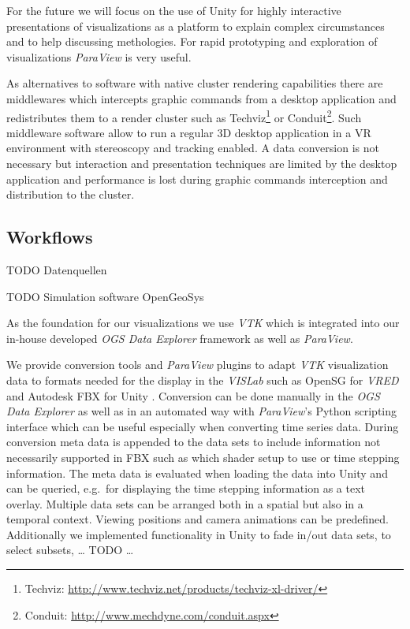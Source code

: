 For the future we will focus on the use of Unity for highly interactive
presentations of visualizations as a platform to explain complex circumstances
and to help discussing methologies. For rapid prototyping and exploration of
visualizations \emph{ParaView} is very useful.

As alternatives to software with native cluster rendering capabilities there are
middlewares which intercepts graphic commands from a desktop application and
redistributes them to a render cluster such as
Techviz\footnote{Techviz: \url{http://www.techviz.net/products/techviz-xl-driver/}} or
Conduit\footnote{Conduit: \url{http://www.mechdyne.com/conduit.aspx}}. Such
middleware software allow to run a regular 3D desktop application in a VR
environment with stereoscopy and tracking enabled. A data conversion is not
necessary but interaction and presentation techniques are limited by the desktop
application and performance is lost during graphic commands interception and
distribution to the cluster.

\subsection{Workflows}
\label{workflows}

TODO Datenquellen

TODO Simulation software OpenGeoSys \cite{kolditz:ogs}

As the foundation for our visualizations we use \emph{VTK} which is
integrated into our in-house developed \emph{OGS Data Explorer} framework
\cite{rink:eesenvirvis} as well as \emph{ParaView}.

We provide conversion tools and \emph{ParaView} plugins to adapt \emph{VTK}
visualization data to formats needed for the display in the \emph{VISLab} such
as OpenSG for \emph{VRED} \cite{bilke:vtkosgconverter} and Autodesk FBX for
Unity \cite{bilke:vtkfbxconverter}. Conversion can be done manually in the
\emph{OGS Data Explorer} as well as in an automated way with \emph{ParaView}'s Python
scripting interface which can be useful especially when converting time
series data. During conversion meta data is appended to the data sets to
include information not necessarily supported in FBX such as which
shader setup to use or time stepping information. The meta data is
evaluated when loading the data into Unity and can be queried, e.g.~for
displaying the time stepping information as a text overlay. Multiple
data sets can be arranged both in a spatial but also in a temporal
context. Viewing positions and camera animations can be predefined.
Additionally we implemented functionality in Unity to fade in/out data
sets, to select subsets, \ldots{} TODO \ldots{}


